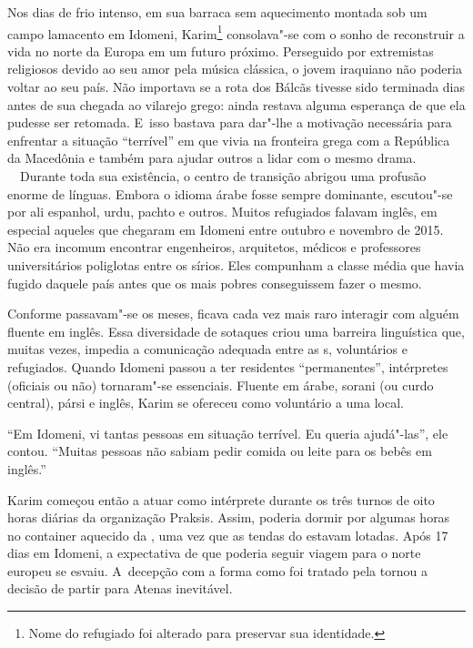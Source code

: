 \putodd{}
\clearpage


 

Nos dias de frio intenso, em sua barraca sem aquecimento montada sob um
campo lamacento em Idomeni, Karim\footnote{ Nome do refugiado foi alterado para preservar sua
identidade.}  consolava"-se com o
sonho de reconstruir a vida no norte da Europa em um futuro próximo.
Perseguido por extremistas religiosos devido ao seu amor pela música
clássica, o jovem iraquiano não poderia voltar ao seu país. Não
importava se a rota dos Bálcãs tivesse sido terminada dias antes de sua
chegada ao vilarejo grego: ainda restava alguma esperança de que ela
pudesse ser retomada. E~isso bastava para dar"-lhe a motivação necessária
para enfrentar a situação ``terrível'' em que vivia na fronteira grega
com a República da Macedônia e também para ajudar outros a lidar com o
mesmo drama.
\ \
Durante toda sua existência, o centro de transição abrigou uma
profusão enorme de línguas. Embora o idioma árabe fosse sempre
dominante, escutou"-se por ali espanhol, urdu, pachto e outros.
Muitos refugiados falavam inglês, em especial aqueles que chegaram em
Idomeni entre outubro e novembro de 2015. Não era incomum encontrar
 engenheiros, arquitetos, médicos e professores
universitários poliglotas entre os sírios. Eles compunham a classe média que havia
fugido daquele país antes que os mais pobres conseguissem fazer o mesmo.

Conforme passavam"-se os meses, ficava cada vez mais raro interagir com
alguém fluente em inglês. Essa diversidade de sotaques criou uma
barreira linguística que, muitas vezes, impedia a comunicação adequada entre as  s, voluntários e
refugiados. Quando Idomeni passou a ter
residentes ``permanentes'', intérpretes (oficiais ou não) tornaram"-se
essenciais. Fluente em árabe, sorani (ou curdo central), pársi e inglês,
Karim se ofereceu como voluntário a uma \versal{ONG} local.

``Em Idomeni, vi tantas pessoas em situação terrível. Eu queria
ajudá"-las'', ele contou. ``Muitas pessoas não sabiam pedir comida ou
leite para os bebês em inglês.''

Karim começou então a atuar como intérprete durante os três turnos de
oito horas diárias da organização Praksis. Assim, poderia dormir por
algumas horas no container aquecido da \versal{ONG}, uma vez que as tendas do 
estavam lotadas. Após 17 dias em Idomeni, a expectativa de que poderia
seguir viagem para o norte europeu se esvaiu. A~decepção com a forma
como foi tratado pela \versal{ONG} tornou a decisão de partir para Atenas
inevitável.

